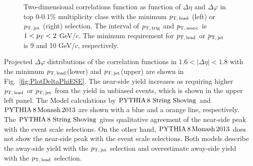 \begin{figure}[h!]
	\centering
	\caption{ Two-dimensional correlations function as function of $\Delta\eta$ and $\Delta\varphi$ in top 0-0.1\% multiplicity class with the minimum $p_\mathrm{T,\,lead}$ (left) or $p_\mathrm{T,\,jet}$ (right) selection. The interval of $p_\mathrm{T,\,trig}$ and $p_\mathrm{T,\,assoc}$ is $1<p_\mathrm{T}<2$ GeV/$c$. The minimum requirement for $p_\mathrm{T,\,lead}$ or $p_\mathrm{T,\,jet}$ is 9 and 10 GeV/$c$, respectively. }
	\label{fig:PlotCorrHMTSel}
\end{figure}

Projected $\Delta\varphi$ distributions of the correlation functions in $1.6<|\Delta\eta|<1.8$ with the minimum $p_\mathrm{T,\,lead}$(lower) and $p_\mathrm{T,\,jet}$(upper) are shown in Fig.~\ref{fig:PlotDeltaPhiESE}. The near-side yield increases as requiring higher $p_\mathrm{T,\,lead}$ or $p_\mathrm{T,\,jet}$ from the yield in unbiased events, which is shown in the upper left panel. The Model calculations by $\mathrm{PYTHIA}\,8~\mathrm{String}~\mathrm{Shoving}$ and $\mathrm{PYTHIA}\,8\,\mathrm{Monash}\,2013$ are shown with a blue and a orange line, respectively. The $\mathrm{PYTHIA}\,8~\mathrm{String}~\mathrm{Shoving}$ gives qualitative agreement of the near-side peak with the event scale selections. On the other hand, $\mathrm{PYTHIA}\,8\,\mathrm{Monash}\,2013$ does not show the near-side peak with the event scale selections. Both models describe the away-side yield with the $p_\mathrm{T,\,jet}$ selection and overestimate away-side yield with the $p_\mathrm{T,\,lead}$ selection.


